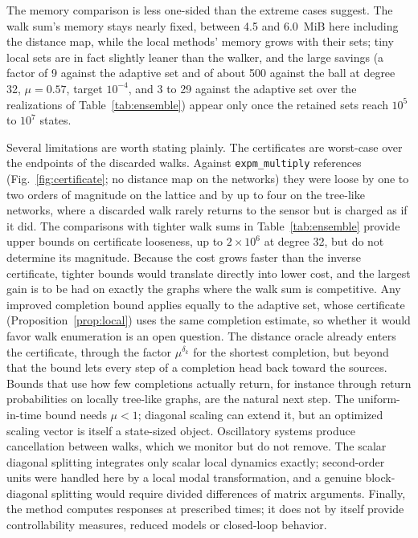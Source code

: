 \documentclass[aps,pra,superscriptaddress,floatfix,longbibliography,twocolumn]{revtex4-2}
\begin{document}
The memory comparison is less one-sided than the extreme cases suggest. The walk sum's memory stays nearly fixed, between 4.5 and 6.0~MiB here including the distance map, while the local methods' memory grows with their sets; tiny local sets are in fact slightly leaner than the walker, and the large savings (a factor of 9 against the adaptive set and of about 500 against the ball at degree 32, $\mu=0.57$, target $10^{-4}$, and 3 to 29 against the adaptive set over the realizations of Table~\ref{tab:ensemble}) appear only once the retained sets reach $10^5$ to $10^7$ states.

Several limitations are worth stating plainly. The certificates are worst-case over the endpoints of the discarded walks. Against \texttt{expm\_multiply} references (Fig.~\ref{fig:certificate}; no distance map on the networks) they were loose by one to two orders of magnitude on the lattice and by up to four on the tree-like networks, where a discarded walk rarely returns to the sensor but is charged as if it did. The comparisons with tighter walk sums in Table~\ref{tab:ensemble} provide upper bounds on certificate looseness, up to $2\times10^6$ at degree 32, but do not determine its magnitude. Because the cost grows faster than the inverse certificate, tighter bounds would translate directly into lower cost, and the largest gain is to be had on exactly the graphs where the walk sum is competitive. Any improved completion bound applies equally to the adaptive set, whose certificate (Proposition~\ref{prop:local}) uses the same completion estimate, so whether it would favor walk enumeration is an open question. The distance oracle already enters the certificate, through the factor $\mu^{\delta_k}$ for the shortest completion, but beyond that the bound lets every step of a completion head back toward the sources. Bounds that use how few completions actually return, for instance through return probabilities on locally tree-like graphs, are the natural next step. The uniform-in-time bound needs $\mu<1$; diagonal scaling can extend it, but an optimized scaling vector is itself a state-sized object. Oscillatory systems produce cancellation between walks, which we monitor but do not remove. The scalar diagonal splitting integrates only scalar local dynamics exactly; second-order units were handled here by a local modal transformation, and a genuine block-diagonal splitting would require divided differences of matrix arguments. Finally, the method computes responses at prescribed times; it does not by itself provide controllability measures, reduced models or closed-loop behavior.
\end{document}
